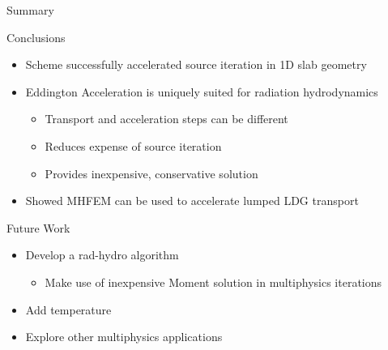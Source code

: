 \documentclass[10pt]{beamer}
\begin{document}
\begin{frame}{Summary}

    \onslide<+->
    Conclusions
    \begin{itemize} \vspace{-.1in}
        \item Scheme successfully accelerated source iteration in 1D slab geometry 



        \item Eddington Acceleration is uniquely suited for radiation hydrodynamics 
        \begin{itemize}
        	\item Transport and acceleration steps can be different 
        	\item Reduces expense of source iteration 
        	\item Provides inexpensive, conservative solution 
        \end{itemize}

        \item Showed MHFEM can be used to accelerate lumped LDG transport 

    \end{itemize}

    \onslide<+->
    Future Work 
    \begin{itemize} \vspace{-.1in}
        \item Develop a rad-hydro algorithm 

        \begin{itemize}
            \item Make use of inexpensive Moment solution in multiphysics iterations 
        \end{itemize}

        \item Add temperature 


        \item Explore other multiphysics applications 

    \end{itemize}

\end{frame}
\end{document}
